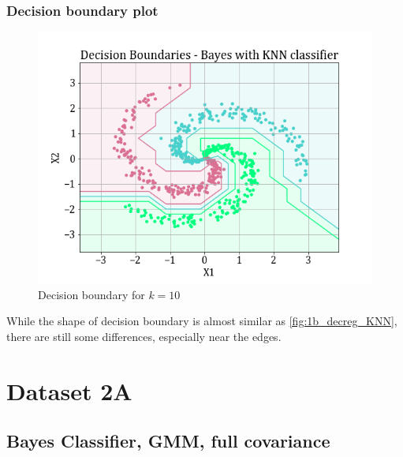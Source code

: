 \documentclass[11pt,a4paper]{article}
\begin{document}
\subsubsection{Decision boundary plot}
\begin{figure}[H]
    \centering
    \includegraphics[scale=0.7]{images/1B/1b_nb_decision_region.png}
    \caption{Decision boundary for $k=10$}
    \label{fig:1b_decreg_nb}
\end{figure}
While the shape of decision boundary is almost similar as \autoref{fig:1b_decreg_KNN}, there are still some differences, especially near the edges.

\break
\section{Dataset 2A}
\subsection{Bayes Classifier, GMM, full covariance}
\end{document}

